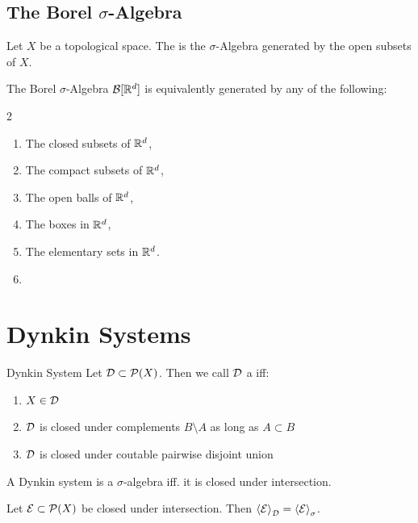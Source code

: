 \subsection{The Borel $\sigma$-Algebra}
\begin{definition}
	Let $X$ be a topological space. The  is the $\sigma$-Algebra generated by the open subsets of $X$.
\end{definition}
\begin{theorem}
	The Borel $\sigma$-Algebra $\mathcal{B}[\mathbb{R}^d]$ is equivalently generated by any of the following:
	\begin{multicols}{2}
		\begin{enumerate}
			\item The closed subsets of $\mathbb{R}^d$,
			\item The compact subsets of $\mathbb{R}^d$,
			\item The open balls of $\mathbb{R}^d$,
			\item The boxes in $\mathbb{R}^d$,
			\item The elementary sets in $\mathbb{R}^d$.
			\item[]
		\end{enumerate}
	\end{multicols}
\end{theorem}
\clearpage

\section{Dynkin Systems}
\begin{importantdefinition}{Dynkin System}{}
	Let $\mathcal{D} \subset \mathcal{P}(X)$. Then we call $\mathcal{D}$ a  iff:
	\begin{enumerate}
		\item $X \in \mathcal{D}$
		\item $\mathcal{D}$ is closed under complements $B \setminus A$ as long as $A \subset B$
		\item $\mathcal{D}$ is closed under coutable pairwise disjoint union
	\end{enumerate}
\end{importantdefinition}	
\begin{importanttheorem}{}{}
	A Dynkin system is a $\sigma$-algebra iff. it is closed under intersection.
\end{importanttheorem}
\begin{theorem}
	Let $\mathcal{E} \subset \mathcal{P}(X)$ be closed under intersection. Then $\left\langle \mathcal{E} \right\rangle_{\mathcal{D}} = \left\langle \mathcal{E} \right\rangle_\sigma$.
\end{theorem}
\clearpage

